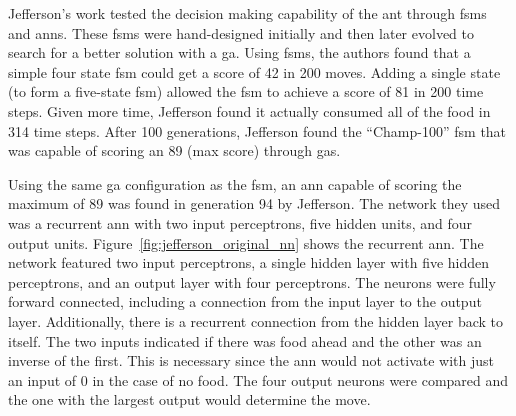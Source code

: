 Jefferson's work tested the decision making capability of the ant through \glspl{fsm} and \glspl{ann}. These \glspl{fsm} were hand-designed initially and then later evolved to search for a better solution with a \gls{ga}. Using \glspl{fsm}, the authors found that a simple four state \gls{fsm} could get a score of 42 in 200 moves. Adding a single state (to form a five-state \gls{fsm}) allowed the \gls{fsm} to achieve a score of 81 in 200 time steps. Given more time, Jefferson found it actually consumed all of the food in 314 time steps. After 100 generations, Jefferson found the ``Champ-100'' \gls{fsm} that was capable of scoring an 89 (max score) through \glspl{ga}.

Using the same \gls{ga} configuration as the \gls{fsm}, an \gls{ann} capable of scoring the maximum of 89 was found in generation 94 by Jefferson. The network they used was a recurrent \gls{ann} with two input perceptrons, five hidden units, and four output units. Figure~\ref{fig:jefferson_original_nn} shows the recurrent \gls{ann}. The network featured two input perceptrons, a single hidden layer with five hidden perceptrons, and an output layer with four perceptrons. The neurons were fully forward connected, including a connection from the input layer to the output layer. Additionally, there is a recurrent connection from the hidden layer back to itself. The two inputs indicated if there was food ahead and the other was an inverse of the first. This is necessary since the \gls{ann} would not activate with just an input of 0 in the case of no food. The four output neurons were compared and the one with the largest output would determine the move.

